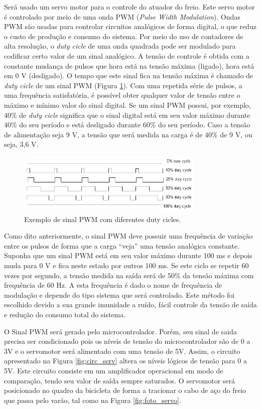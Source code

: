 Será usado um servo motor para o controle do atuador do freio. Este servo motor é controlado por meio de uma onda PWM (\textit{Pulse Width Modulation}). Ondas PWM são usadas para controlar circuitos analógicos de forma digital, o que reduz o custo de produção e consumo do sistema. Por meio do uso de contadores de alta resolução, o \textit{duty cicle} de uma onda quadrada pode ser modulado para codificar certo valor de um sinal analógico. A tensão de controle é obtida com a constante mudança de pulsos que hora está na tensão máxima (ligado), hora está em 0 V (desligado). O tempo que este sinal fica na tensão máxima é chamado de \textit{duty cicle} de um sinal PWM (Figura \ref{fig:pwmcircuito}). Com uma repetida série de pulsos, a uma frequência satisfatória, é possível obter qualquer valor de tensão entre o máximo e mínimo valor do sinal digital.
Se um sinal PWM possui, por exemplo, 40\% de \textit{duty cicle} significa que o sinal digital está em seu valor máximo durante 40\% do seu período e está desligado durante 60\% do seu período. Caso a tensão de alimentação seja 9 V, a tensão que será medida na carga é de 40\% de 9 V, ou seja, 3,6 V.
\begin{figure}[h]
  \centering
	\includegraphics[width=0.8\textwidth]{figuras/pwmExample.png}
  \caption{Exemplo de sinal PWM com diferentes duty cicles.}
  \label{fig:pwmcircuito}
\end{figure}


Como dito anteriormente, o sinal PWM deve possuir uma frequência de variação entre os pulsos de forma que a carga “veja” uma tensão analógica constante. Suponha que um sinal PWM está em seu valor máximo durante 100 ms e depois muda para 0 V e fica neste estado por outros 100 ms. Se este ciclo se repetir 60 vezes por segundo, a tensão medida na saída será de 50\% da tensão máxima com frequência de 60 Hz. A esta frequência é dado o nome de frequência de modulação e depende do tipo sistema que será controlado.
Este método foi escolhido devido a sua grande imunidade a ruído, fácil controle da tensão de saída e redução do consumo total do sistema.

O Sinal PWM será gerado pelo microcontrolador. Porém, seu sinal de saida precisa ser condicionado pois os níveis de tensão do microcontrolador são de 0 a 3V e o servomotor será alimentado com uma tensão de 5V. Assim, o circuito apresentado na Figura \ref{fig:circ_serv} altera os níveis lógicos de tensão para 0 a 5V. Este circuito consiste em um amplificador operacional em modo de comparação, tendo seu valor de saída sempre saturados. O servomotor será posicionado no quadro da bicicleta de forma a tracionar o cabo de aço do freio que passa pelo varão, tal como na Figura \ref{fig:foto_servo}.

